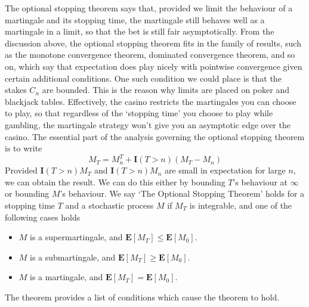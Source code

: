 The optional stopping theorem says that, provided we limit the behaviour of a martingale and its stopping time, the martingale still behaves well as a martingale in a limit, so that the bet is still fair asymptotically. From the discussion above, the optional stopping theorem fits in the family of results, such as the monotone convergence theorem, dominated convergence theorem, and so on, which say that expectation does play nicely with pointwise convergence given certain additional conditions. One such condition we could place is that the stakes $C_n$ are bounded. This is the reason why limits are placed on poker and blackjack tables. Effectively, the casino restricts the martingales you can choose to play, so that regardless of the `stopping time' you choose to play while gambling, the martingale strategy won't give you an asymptotic edge over the casino. The essential part of the analysis governing the optional stopping theorem is to write
%
\[ M_T = M^T_n + \mathbf{I}(T > n) (M_T - M_n) \]
%
Provided $\mathbf{I}(T > n) M_T$ and $\mathbf{I}(T > n) M_n$ are small in expectation for large $n$, we can obtain the result. We can do this either by bounding $T$'s behaviour at $\infty$ or bounding $M$'s behaviour. We say `The Optional Stopping Theorem' holds for a stopping time $T$ and a stochastic process $M$ if $M_T$ is integrable, and one of the following cases holds
%
\begin{itemize}
    \item $M$ is a supermartingale, and $\mathbf{E}[M_T] \leq \mathbf{E}[M_0]$.
    \item $M$ is a submartingale, and $\mathbf{E}[M_T] \geq \mathbf{E}[M_0]$.
    \item $M$ is a martingale, and $\mathbf{E}[M_T] = \mathbf{E}[M_0]$.
\end{itemize}
%
The theorem provides a list of conditions which cause the theorem to hold.

